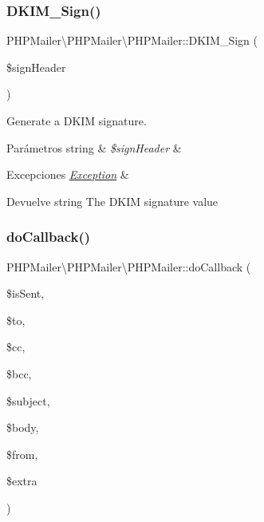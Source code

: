 \subsubsection{\texorpdfstring{D\+K\+I\+M\+\_\+\+Sign()}{DKIM\_Sign()}}
{\footnotesize\ttfamily P\+H\+P\+Mailer\textbackslash{}\+P\+H\+P\+Mailer\textbackslash{}\+P\+H\+P\+Mailer\+::\+D\+K\+I\+M\+\_\+\+Sign (\begin{DoxyParamCaption}\item[{}]{\$sign\+Header }\end{DoxyParamCaption})}

Generate a D\+K\+IM signature.


\begin{DoxyParams}[1]{Parámetros}
string & {\em \$sign\+Header} & \\
\hline
\end{DoxyParams}

\begin{DoxyExceptions}{Excepciones}
{\em \hyperlink{classPHPMailer_1_1PHPMailer_1_1Exception}{Exception}} & \\
\hline
\end{DoxyExceptions}
\begin{DoxyReturn}{Devuelve}
string The D\+K\+IM signature value 
\end{DoxyReturn}
\mbox{\label{classPHPMailer_1_1PHPMailer_1_1PHPMailer_a0d502e3da4dec7763b468426c11ddfff}} 
\subsubsection{\texorpdfstring{do\+Callback()}{doCallback()}}
{\footnotesize\ttfamily P\+H\+P\+Mailer\textbackslash{}\+P\+H\+P\+Mailer\textbackslash{}\+P\+H\+P\+Mailer\+::do\+Callback (\begin{DoxyParamCaption}\item[{}]{\$is\+Sent,  }\item[{}]{\$to,  }\item[{}]{\$cc,  }\item[{}]{\$bcc,  }\item[{}]{\$subject,  }\item[{}]{\$body,  }\item[{}]{\$from,  }\item[{}]{\$extra }\end{DoxyParamCaption})\hspace{0.3cm}{\ttfamily [protected]}}


